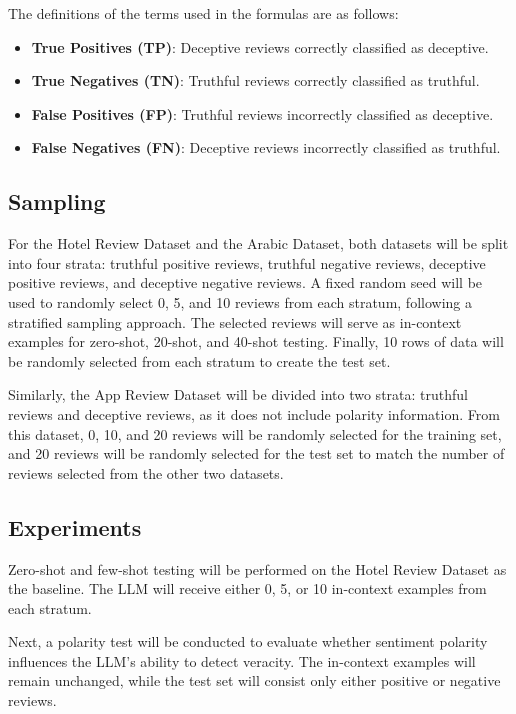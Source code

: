 \documentclass[sigconf, nonacm]{acmart}
\theoremstyle{definition}
\begin{document}
\noindent The definitions of the terms used in the formulas are as follows:
\begin{itemize}
  \item \textbf{True Positives (TP)}: Deceptive reviews correctly classified as deceptive.
  \item \textbf{True Negatives (TN)}: Truthful reviews correctly classified as truthful.
  \item \textbf{False Positives (FP)}: Truthful reviews incorrectly classified as deceptive.
  \item \textbf{False Negatives (FN)}: Deceptive reviews incorrectly classified as truthful.
\end{itemize}

\subsection{Sampling}
For the Hotel Review Dataset and the Arabic Dataset, both datasets will be split into four strata: truthful positive reviews, truthful negative reviews, deceptive positive reviews, and deceptive negative reviews. A fixed random seed will be used to randomly select 0, 5, and 10 reviews from each stratum, following a stratified sampling approach. The selected reviews will serve as in-context examples for zero-shot, 20-shot, and 40-shot testing. Finally, 10 rows of data will be randomly selected from each stratum to create the test set.

Similarly, the App Review Dataset will be divided into two strata: truthful reviews and deceptive reviews, as it does not include polarity information. From this dataset, 0, 10, and 20 reviews will be randomly selected for the training set, and 20 reviews will be randomly selected for the test set to match the number of reviews selected from the other two datasets.

\subsection{Experiments}

Zero-shot and few-shot testing will be performed on the Hotel Review Dataset as the baseline. The LLM will receive either 0, 5, or 10 in-context examples from each stratum.

Next, a polarity test will be conducted to evaluate whether sentiment polarity influences the LLM's ability to detect veracity. The in-context examples will remain unchanged, while the test set will consist only either positive or negative reviews.
\end{document}
